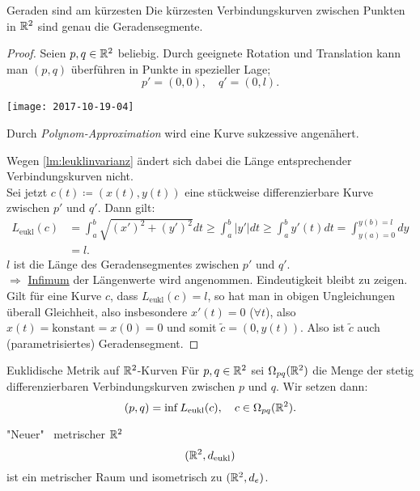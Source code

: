 \begin{lemma}{Geraden sind am kürzesten}
  Die kürzesten Verbindungskurven zwischen Punkten in $ \mathbb{R}^2 $ sind genau die Geradensegmente. \\
  \begin{proof}
    Seien $ p, q \in \mathbb{R}^2 $ beliebig. Durch geeignete Rotation und Translation kann man $ (p,q) $ überführen in Punkte in spezieller Lage;
    \begin{equation*}
      p' = (0,0), \quad q' = (0,l)\text{.}
    \end{equation*}
    \begin{marginfigure}
      \texttt{[image: 2017-10-19-04]}
      \caption{Durch \emph{Polynom-Approximation} wird eine Kurve sukzessive angenähert.}
    \end{marginfigure}
    Wegen \autoref{lm:leuklinvarianz} ändert sich dabei die Länge entsprechender Verbindungskurven nicht. \\
    Sei jetzt $ c(t) \coloneqq (x(t),y(t)) $ eine stückweise differenzierbare Kurve zwischen $ p' $ und $ q' $. Dann gilt:
    \begin{align*}
      L_\text{eukl}(c) &= \int_a^b\sqrt{(x')^2+(y')^2}dt \geq \int_a^b\vert y' \vert dt \geq \int_a^by'(t)dt = \int_{y(a) = 0}^{y(b) = l} dy \\
       &= l\text{.}
    \end{align*}
    $ l $ ist die Länge des Geradensegmentes zwischen $ p' $ und $ q' $. \\
    $ \Rightarrow $ \underline{Infimum} der Längenwerte wird angenommen. Eindeutigkeit bleibt zu zeigen. \\
    Gilt für eine Kurve $ c $, dass $ L_\text{eukl}(c) = l $, so hat man in obigen Ungleichungen überall Gleichheit, also insbesondere $ x'(t) = 0 $ ($ \forall t $), also $ x(t) = \text{konstant} = x(0) = 0 $ und somit $ \widetilde{c} = (0,y(t)) $. Also ist $ \widetilde{c} $ auch (parametrisiertes) Geradensegment.
  \end{proof}
\end{lemma}

\begin{definition}{Euklidische Metrik auf $ \mathbb{R}^2 $-Kurven}
  Für $ p,q \in \mathbb{R}^2 $ sei $ \Omega_{pq}(\mathbb{R}^2) $ die Menge der stetig differenzierbaren Verbindungskurven zwischen $ p $ und $ q $. Wir setzen dann:
  \begin{equation*}
    (p,q) = \inf L_\text{eukl}(c), \quad c \in \Omega_{pq}(\mathbb{R}^2)\text{.}
  \end{equation*}
\end{definition}

\begin{theorem}{"Neuer" \ metrischer $ \mathbb{R}^2 $}
  \begin{equation*}
    (\mathbb{R}^2, d_\text{eukl})
  \end{equation*}
  ist ein metrischer Raum und isometrisch zu $ (\mathbb{R}^2, d_e) $.
\end{theorem}